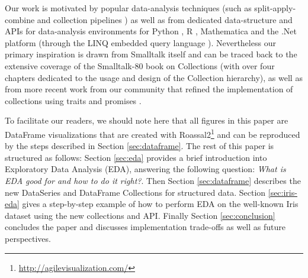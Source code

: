 \documentclass[sigplan]{acmart}
\begin{document}
Our work is motivated by popular data-analysis techniques (such as split-apply-combine \cite{wickham2011split} and collection pipelines \cite{Fowler15}) as well as from dedicated data-structure and APIs for data-analysis environments for Python \cite{McKinney}, R \cite{team2000r}, Mathematica \cite{wolfram1999mathematica} and the .Net platform (through the LINQ embedded query language \cite{meijer2006linq}). Nevertheless our primary inspiration is drawn from Smalltalk itself and can be traced back to the extensive coverage of the Smalltalk-80 book on Collections \cite{Goldberg} (with over four chapters dedicated to the usage and design of the Collection hierarchy), as well as from more recent work from our community that refined the implementation of collections using traits \cite{black2003applying, bourgois2010bloc, scharli2003traits} and promises \cite{Alcocer16}.

To facilitate our readers, we should note here that all figures in this paper are DataFrame visualizations that are created with Roassal2\footnote{\url{http://agilevisualization.com/}} and can be reproduced by the steps described in Section \ref{sec:dataframe}.
The rest of this paper is structured as follows: Section \ref{sec:eda} provides a brief introduction into Exploratory Data Analysis (EDA), answering the following question: \textit{What is EDA good for and how to do it right?}. Then Section \ref{sec:dataframe} describes the new DataSeries and DataFrame Collections for structured data. Section \ref{sec:iris-eda} gives a step-by-step example of how to perform EDA on the well-known Iris dataset using the new collections and API.
Finally Section \ref{sec:conclusion} concludes the paper and discusses implementation trade-offs as well as future perspectives.



%
%
%
%
\end{document}
